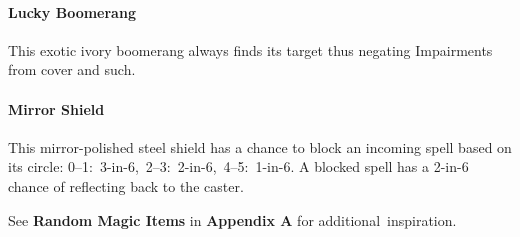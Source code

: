 \documentclass[itdr]{subfiles}
\begin{document}
\paragraph{Lucky Boomerang}
This exotic ivory boomerang always finds its target thus negating Impairments from cover and such.

\paragraph{Mirror Shield}
This mirror-polished steel shield has a chance to block an incoming spell based on its circle: \mbox{0--1: 3-in-6, 2--3: 2-in-6, 4--5: 1-in-6}. A blocked spell has a 2-in-6 chance of reflecting back to the caster.

\vfill

\begin{dbox}
	See \textbf{Random Magic Items} in \textbf{Appendix A} for \mbox{additional inspiration}.
\end{dbox}
\end{document}
